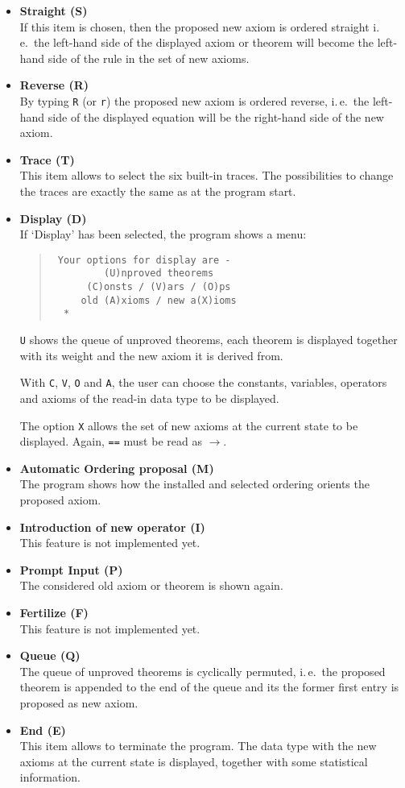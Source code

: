 \begin{itemize}
\item {\bf Straight (S)}\\
If this item is chosen, then the proposed new axiom is ordered straight
i.\,e.\  the left-hand side of the displayed axiom or theorem will become the
left-hand side of the rule in the set of new axioms.
\item {\bf Reverse (R)}\\
By typing {\tt R} (or {\tt r}) the proposed new axiom is ordered
reverse, i.\,e.\  the left-hand side of the displayed equation will be the
right-hand side of the new axiom.
\item {\bf Trace (T)}\\
This item allows to select the six built-in traces. The possibilities 
to change the traces are exactly the same as at the program start.
\item {\bf Display (D)}\\
If `Display' has been selected, the program shows a menu:
\begin{quote}
\begin{verbatim} 
 Your options for display are -
         (U)nproved theorems
      (C)onsts / (V)ars / (O)ps
     old (A)xioms / new a(X)ioms
  *
\end{verbatim}
\end{quote}
{\tt U} shows the queue of unproved theorems, each theorem is displayed together
with  its weight and the new axiom it is derived from.

With {\tt C}, {\tt V}, {\tt O} and {\tt A}, the user can choose the constants, 
variables, operators and axioms of the read-in data type to be displayed.

The option {\tt X} allows the set of new axioms at the current state to
be displayed. Again, {\tt ==} must be read as $\rightarrow$.
\item {\bf Automatic Ordering proposal (M)}\\
The program shows how the installed and selected ordering orients the proposed
axiom.
\item {\bf Introduction of new operator (I)}\\
This feature is not implemented yet.
\item {\bf Prompt Input (P)}\\
The considered old axiom or theorem is shown again.
\item {\bf Fertilize (F)}\\
This feature is not implemented yet.
\item {\bf Queue (Q)}\\
The queue of unproved theorems is cyclically permuted, i.\,e.\  the proposed
theorem is appended to the end of the queue and its the former first entry is
proposed as new axiom.
\item {\bf End (E)}\\
This item allows to terminate the program. The data type with the new
axioms at the current state is displayed, together with some statistical
information.
\end{itemize}
